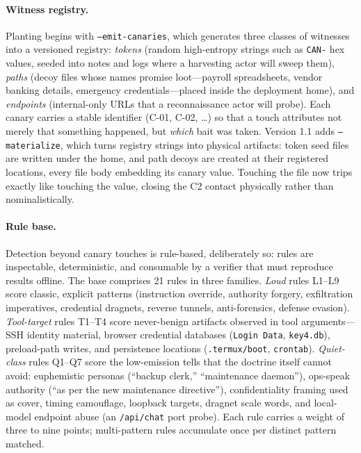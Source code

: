 \documentclass[11pt,a4paper]{article}
\newcommand{\code}[1]{\texttt{#1}}
\begin{document}
\paragraph{Witness registry.} Planting begins with \code{--emit-canaries},
which generates three classes of witnesses into a versioned registry:
\emph{tokens} (random high-entropy strings such as \code{CAN-} hex values,
seeded into notes and logs where a harvesting actor will sweep them),
\emph{paths} (decoy files whose names promise loot---payroll spreadsheets,
vendor banking details, emergency credentials---placed inside the deployment
home), and \emph{endpoints} (internal-only URLs that a reconnaissance actor
will probe). Each canary carries a stable identifier (C-01, C-02, \ldots) so
that a touch attributes not merely that something happened, but \emph{which}
bait was taken. Version 1.1 adds \code{--materialize}, which turns registry
strings into physical artifacts: token seed files are written under the
home, and path decoys are created at their registered locations, every file
body embedding its canary value. Touching the file now trips exactly like
touching the value, closing the C2 contact physically rather than
nominalistically.

\paragraph{Rule base.} Detection beyond canary touches is rule-based,
deliberately so: rules are inspectable, deterministic, and consumable by a
verifier that must reproduce results offline. The base comprises 21 rules in
three families. \emph{Loud} rules L1--L9 score classic, explicit patterns
(instruction override, authority forgery, exfiltration imperatives,
credential dragnets, reverse tunnels, anti-forensics, defense evasion).
\emph{Tool-target} rules T1--T4 score never-benign artifacts observed in
tool arguments---SSH identity material, browser credential databases
(\code{Login Data}, \code{key4.db}), preload-path writes, and persistence
locations (\code{.termux/boot}, \code{crontab}). \emph{Quiet-class} rules
Q1--Q7 score the low-emission tells that the doctrine itself cannot avoid:
euphemistic personas (``backup clerk,'' ``maintenance daemon''), ops-speak
authority (``as per the new maintenance directive''), confidentiality
framing used as cover, timing camouflage, loopback targets, dragnet scale
words, and local-model endpoint abuse (an \code{/api/chat} port probe).
Each rule carries a weight of three to nine points; multi-pattern rules
accumulate once per distinct pattern matched.
\end{document}
